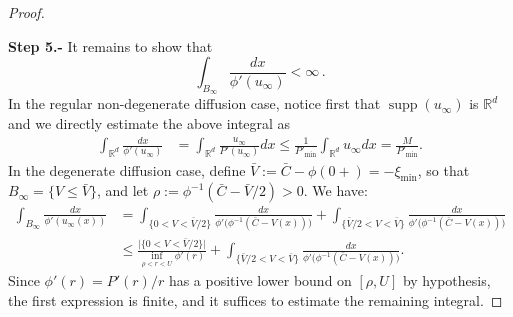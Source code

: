 \documentclass[10pt,a4paper]{amsart}
\DeclareMathOperator{\supp}{supp}
\newcommand{\R}{\mathbb{R}}
\newcommand{\uinf}{u_\infty}
\newcommand{\ximin}{\xi_{\text{min}}}
\begin{document}
\begin{proof}
\
    
{\bf Step 5.-} It remains to show that 
    $$
    \int_{B_\infty}\frac{dx}{\phi'(\uinf)}<\infty\,.
    $$
In the regular non-degenerate diffusion case, notice first that $\supp(u_\infty)$ is $\R^d$ and we directly estimate the above integral as
    \begin{align*}
        \int_{\R^d}\frac{dx}{\phi'(u_\infty)}
        &= \int_{\R^d}\frac{\uinf}{P'(u_\infty)}dx\leq \frac1{P'_{\text{min}}}\int_{\R^d}\uinf dx=\frac{M}{P'_{\text{min}}}.
    \end{align*}
    In the degenerate diffusion case, define $\bar V:=\bar C-\phi(0+)=-\ximin$, so that $B_\infty=\{V\le\bar V\}$, and let $\rho:=\phi^{-1}(\bar C-\bar V/2)>0$. We have:
    \begin{align*}
        \int_{B_\infty}\frac{dx}{\phi'(u_\infty(x))}
        &= \int_{\{0<V<\bar V/2\}}\frac{dx}{\phi'\big(\phi^{-1}(\bar C-V(x))\big)}
        +\int_{\{\bar V/2< V<\bar V\}}\frac{dx}{\phi'\big(\phi^{-1}(\bar C-V(x))\big)}\\
        &\le \frac{\big|\{0<V<\bar V/2\}\big|}{\inf_{\rho<r< U}\phi'(r)}
        +\int_{\{\bar V/2< V<\bar V \}}\frac{dx}{\phi'\big(\phi^{-1}(\bar C-V(x))\big)}.
    \end{align*}
    Since $\phi'(r)=P'(r)/r$ has a positive lower bound on $[\rho, U]$ by hypothesis, the first expression is finite, and it suffices to estimate the remaining integral.


\end{proof}
\end{document}
